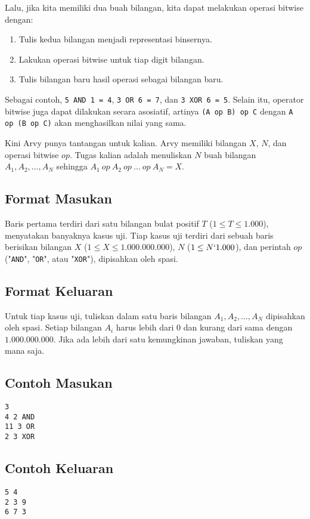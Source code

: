 \documentclass{article}
\begin{document}
Lalu, jika kita memiliki dua buah bilangan, kita dapat melakukan operasi bitwise dengan:
\begin{enumerate}
    \item Tulis kedua bilangan menjadi representasi binsernya.
    \item Lakukan operasi bitwise untuk tiap digit bilangan.
    \item Tulis bilangan baru hasil operasi sebagai bilangan baru.
\end{enumerate}

Sebagai contoh, \lstinline{5 AND 1 = 4}, \lstinline{3 OR 6 = 7}, dan \lstinline{3 XOR 6 = 5}.
Selain itu, operator bitwise juga dapat dilakukan secara asosiatif, artinya \lstinline{(A op B) op C} dengan \lstinline{A op (B op C)} akan menghasilkan nilai yang sama.

Kini Arvy punya tantangan untuk kalian.
Arvy memiliki bilangan $X$, $N$, dan operasi bitwise $op$.
Tugas kalian adalah menuliskan $N$ buah bilangan $A_1, A_2, \dots, A_N$ sehingga $A_1 \  op \  A_2 \  op \  \dots \  op \  A_N = X$.

\subsection*{Format Masukan}

Baris pertama terdiri dari satu bilangan bulat positif $T$ ($1 \leq T \leq 1.000$), menyatakan banyaknya kasus uji.
Tiap kasus uji terdiri dari sebuah baris berisikan bilangan $X$ ($1 \leq X \leq 1.000.000.000$), $N$ ($1 \leq N \lq 1.000$), dan perintah $op$ ("\lstinline{AND}", "\lstinline{OR}", atau "\lstinline{XOR}"), dipisahkan oleh spasi.

\subsection*{Format Keluaran}

Untuk tiap kasus uji, tuliskan dalam satu baris bilangan $A_1, A_2, \dots, A_N$ dipisahkan oleh spasi.
Setiap bilangan $A_i$ harus lebih dari $0$ dan kurang dari sama dengan $1.000.000.000$.
Jika ada lebih dari satu kemungkinan jawaban, tuliskan yang mana saja.
\\

\begin{multicols}{2}
\subsection*{Contoh Masukan}
\begin{lstlisting}
3
4 2 AND
11 3 OR
2 3 XOR
\end{lstlisting}
\columnbreak
\subsection*{Contoh Keluaran}
\begin{lstlisting}
5 4
2 3 9
6 7 3
\end{lstlisting}
\vfill
\null
\end{multicols}

\pagebreak
\end{document}
